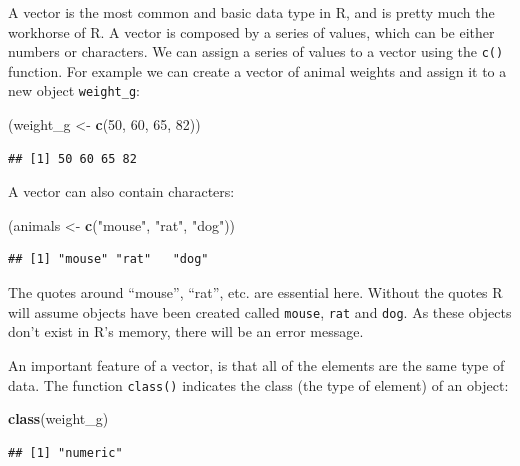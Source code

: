 \documentclass[
]{article}
\newenvironment{Shaded}{\begin{snugshade}}{\end{snugshade}}
\newcommand{\DecValTok}[1]{\textcolor[rgb]{0.00,0.00,0.81}{#1}}
\newcommand{\KeywordTok}[1]{\textcolor[rgb]{0.13,0.29,0.53}{\textbf{#1}}}
\newcommand{\NormalTok}[1]{#1}
\newcommand{\StringTok}[1]{\textcolor[rgb]{0.31,0.60,0.02}{#1}}
\begin{document}
A vector is the most common and basic data type in R, and is pretty much
the workhorse of R. A vector is composed by a series of values, which
can be either numbers or characters. We can assign a series of values to
a vector using the \texttt{c()} function. For example we can create a
vector of animal weights and assign it to a new object
\texttt{weight\_g}:

\begin{Shaded}
\begin{Highlighting}[]
\NormalTok{(weight_g <-}\StringTok{ }\KeywordTok{c}\NormalTok{(}\DecValTok{50}\NormalTok{, }\DecValTok{60}\NormalTok{, }\DecValTok{65}\NormalTok{, }\DecValTok{82}\NormalTok{))}
\end{Highlighting}
\end{Shaded}

\begin{verbatim}
## [1] 50 60 65 82
\end{verbatim}

A vector can also contain characters:

\begin{Shaded}
\begin{Highlighting}[]
\NormalTok{(animals <-}\StringTok{ }\KeywordTok{c}\NormalTok{(}\StringTok{"mouse"}\NormalTok{, }\StringTok{"rat"}\NormalTok{, }\StringTok{"dog"}\NormalTok{))}
\end{Highlighting}
\end{Shaded}

\begin{verbatim}
## [1] "mouse" "rat"   "dog"
\end{verbatim}

The quotes around ``mouse'', ``rat'', etc. are essential here. Without
the quotes R will assume objects have been created called
\texttt{mouse}, \texttt{rat} and \texttt{dog}. As these objects don't
exist in R's memory, there will be an error message.

An important feature of a vector, is that all of the elements are the
same type of data. The function \texttt{class()} indicates the class
(the type of element) of an object:

\begin{Shaded}
\begin{Highlighting}[]
\KeywordTok{class}\NormalTok{(weight_g)}
\end{Highlighting}
\end{Shaded}

\begin{verbatim}
## [1] "numeric"
\end{verbatim}
\end{document}
